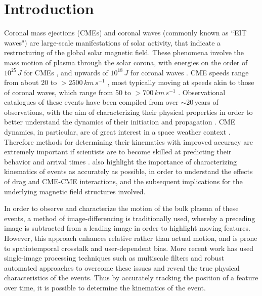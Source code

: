 \documentclass[structabstract]{aa}
\begin{document}
\maketitle

%

\section{Introduction}
\label{sect_intro}

Coronal mass ejections (CMEs) and coronal waves (commonly known as ``EIT waves") are large-scale manifestations of solar activity, that indicate a restructuring of the global solar magnetic field. These phenomena involve the mass motion of plasma through the solar corona, with energies on the order of $10^{25}\,J$ for CMEs \citep{2004JGRA..10910104E}, and upwards of $10^{18}\,J$ for coronal waves \citep{2005ApJ...633L.145B}. CME speeds range from about 20 to $>2500\,km\,s^{-1}$ \citep{2004JGRA..10907105Y}, most typically moving at speeds akin to those of coronal waves, which range from 50 to $>700\,km\,s^{-1}$ \citep{2009ApJS..183..225T}. Observational catalogues of these events have been compiled from over $\sim$20\,years of observations, with the aim of characterizing their physical properties in order to better understand the dynamics of their initiation and propagation \citep[see some recent reviews by][]{2011SSRv..158..365G,2012SoPh..tmp...93P,2011ASSL..376.....H,2012LRSP....9....3W}. CME dynamics, in particular, are of great interest in a space weather context \citep[e.g.,][]{SWE:SWE493, 2010heliophysics, 2005A&A...440..373H}. Therefore methods for determining their kinematics with improved accuracy are extremely important if scientists are to become skilled at predicting their behavior and arrival times \citep[see, for example, efforts by][]{2010NatCo...1E..74B, 2005AnGeo..23.1033S, 2004Natur.432...78P}. \citet{2012ApJ...749...57T} also highlight the importance of characterizing kinematics of events as accurately as possible, in order to understand the effects of drag and CME-CME interactions, and the subsequent implications for the underlying magnetic field structures involved.

In order to observe and characterize the motion of the bulk plasma of these events, a method of image-differencing is traditionally used, whereby a preceding image is subtracted from a leading image in order to highlight moving features. However, this approach enhances relative rather than actual motion, and is prone to spatiotemporal crosstalk and user-dependent bias. More recent work has used single-image processing techniques such as multiscale filters \citep{2011AdSpR..47.2118G, 2009A&A...495..325B, 2008SoPh..248..457Y} and robust automated approaches \citep[e.g.,][]{2012ApJ...752..145B, 2012SoPh..276..479P, 2011A&A...531A..42L} to overcome these issues and reveal the true physical characteristics of the events. Thus by accurately tracking the position of a feature over time, it is possible to determine the kinematics of the event. 
\end{document}
